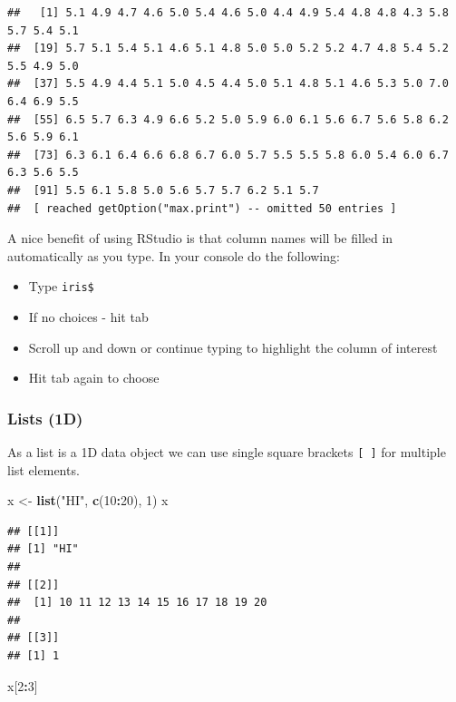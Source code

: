 \documentclass[
]{book}
\newenvironment{Shaded}{\begin{snugshade}}{\end{snugshade}}
\newcommand{\DecValTok}[1]{\textcolor[rgb]{0.00,0.00,0.81}{#1}}
\newcommand{\KeywordTok}[1]{\textcolor[rgb]{0.13,0.29,0.53}{\textbf{#1}}}
\newcommand{\NormalTok}[1]{#1}
\newcommand{\OperatorTok}[1]{\textcolor[rgb]{0.81,0.36,0.00}{\textbf{#1}}}
\newcommand{\StringTok}[1]{\textcolor[rgb]{0.31,0.60,0.02}{#1}}
\providecommand{\tightlist}{%
  \setlength{\itemsep}{0pt}\setlength{\parskip}{0pt}}
\theoremstyle{definition}
\theoremstyle{definition}
\theoremstyle{definition}
\theoremstyle{remark}
\begin{document}
\begin{verbatim}
##   [1] 5.1 4.9 4.7 4.6 5.0 5.4 4.6 5.0 4.4 4.9 5.4 4.8 4.8 4.3 5.8 5.7 5.4 5.1
##  [19] 5.7 5.1 5.4 5.1 4.6 5.1 4.8 5.0 5.0 5.2 5.2 4.7 4.8 5.4 5.2 5.5 4.9 5.0
##  [37] 5.5 4.9 4.4 5.1 5.0 4.5 4.4 5.0 5.1 4.8 5.1 4.6 5.3 5.0 7.0 6.4 6.9 5.5
##  [55] 6.5 5.7 6.3 4.9 6.6 5.2 5.0 5.9 6.0 6.1 5.6 6.7 5.6 5.8 6.2 5.6 5.9 6.1
##  [73] 6.3 6.1 6.4 6.6 6.8 6.7 6.0 5.7 5.5 5.5 5.8 6.0 5.4 6.0 6.7 6.3 5.6 5.5
##  [91] 5.5 6.1 5.8 5.0 5.6 5.7 5.7 6.2 5.1 5.7
##  [ reached getOption("max.print") -- omitted 50 entries ]
\end{verbatim}

A nice benefit of using RStudio is that column names will be filled in automatically as you type. In your console do the following:

\begin{itemize}
\tightlist
\item
  Type \texttt{iris\$}\\
\item
  If no choices - hit tab
\item
  Scroll up and down or continue typing to highlight the column of interest\\
\item
  Hit tab again to choose
\end{itemize}

\hypertarget{lists-1d}{%
\subsubsection{Lists (1D)}\label{lists-1d}}

As a list is a 1D data object we can use single square brackets \texttt{{[}\ {]}} for multiple list elements.

\begin{Shaded}
\begin{Highlighting}[]
\NormalTok{x <-}\StringTok{ }\KeywordTok{list}\NormalTok{(}\StringTok{"HI"}\NormalTok{, }\KeywordTok{c}\NormalTok{(}\DecValTok{10}\OperatorTok{:}\DecValTok{20}\NormalTok{), }\DecValTok{1}\NormalTok{)}
\NormalTok{x}
\end{Highlighting}
\end{Shaded}

\begin{verbatim}
## [[1]]
## [1] "HI"
## 
## [[2]]
##  [1] 10 11 12 13 14 15 16 17 18 19 20
## 
## [[3]]
## [1] 1
\end{verbatim}

\begin{Shaded}
\begin{Highlighting}[]
\NormalTok{x[}\DecValTok{2}\OperatorTok{:}\DecValTok{3}\NormalTok{]}
\end{Highlighting}
\end{Shaded}
\end{document}
